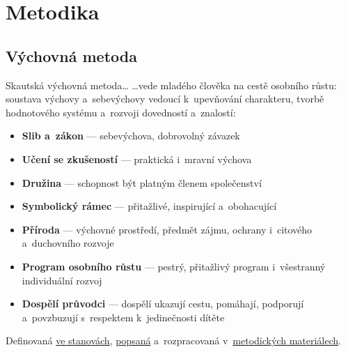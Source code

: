 \documentclass[compress, ucs, xelatex, xcolor=dvipsnames, print,
  hyperref={
    bookmarks=true,
    unicode=true,
    colorlinks=true,
    plainpages=false,
    pdfkeywords={Junak, Pedagogika, Skaut, Skauting, Vychovna metoda},
    linkcolor=Black,
    anchorcolor=Black,
    citecolor=OliveGreen,
    filecolor=OliveGreen,
    menucolor=Black,
    urlcolor=OliveGreen,
    pdftex}
  ]{beamer}
\begin{document}
\section{Metodika}

\subsection{Výchovná metoda}

\begin{frame}{Skautská výchovná metoda\ldots}
  \ldots vede mladého člověka na cestě osobního růstu: soustava výchovy a~sebevýchovy vedoucí k~upevňování charakteru, tvorbě hodnotového systému a~rozvoji dovedností a~znalostí:
  \begin{itemize}
    \item \textbf{Slib a~zákon} --- sebevýchova, dobrovolný závazek
    \item \textbf{Učení se zkušeností} --- praktická i~mravní výchova
    \item \textbf{Družina} --- schopnost být platným členem společenství
    \item \textbf{Symbolický rámec} --- přitažlivé, inspirující a~obohacující
    \item \textbf{Příroda} --- výchovné prostředí, předmět zájmu, ochrany i~citového a~duchovního rozvoje
    \item \textbf{Program osobního růstu} --- pestrý, přitažlivý program i~všestranný individuální rozvoj
    \item \textbf{Dospělí průvodci} --- dospělí ukazují cestu, pomáhají, podporují a~povzbuzují s~respektem k~jedinečnosti dítěte
  \end{itemize}
  Definovaná \href{https://krizovatka.skaut.cz/stredisko/administrativa/novy-obcansky-zakonik-stanovy/nove-stanovy}{ve stanovách}, \href{https://krizovatka.skaut.cz/oddil/program/3360-skautska-vychovna-metoda}{popsaná} a~rozpracovaná v~\href{https://krizovatka.skaut.cz/oddil/program/}{metodických materiálech}.
\end{frame}
\end{document}
